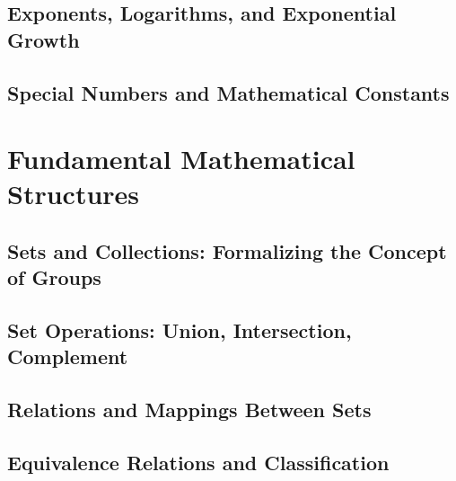 \documentclass[12pt, oneside, openany]{book}
\begin{document}
\section{Exponents, Logarithms, and Exponential Growth}

\section{Special Numbers and Mathematical Constants}


\chapter{Fundamental Mathematical Structures}

\section{Sets and Collections: Formalizing the Concept of Groups}

\section{Set Operations: Union, Intersection, Complement}

\section{Relations and Mappings Between Sets}

\section{Equivalence Relations and Classification}
\end{document}
